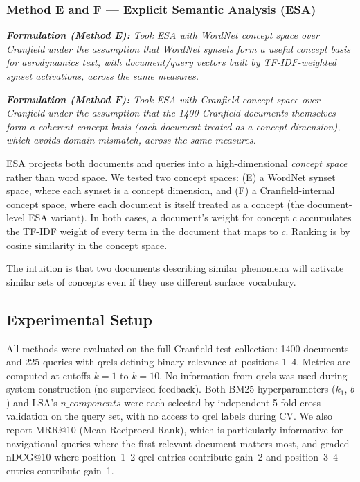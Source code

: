 \documentclass{article}
\begin{document}
\subsubsection{Method E and F --- Explicit Semantic Analysis (ESA)}

\textit{\textbf{Formulation (Method E):} Took ESA with WordNet concept space over Cranfield under the assumption that WordNet synsets form a useful concept basis for aerodynamics text, with document/query vectors built by TF-IDF-weighted synset activations, across the same measures.}

\textit{\textbf{Formulation (Method F):} Took ESA with Cranfield concept space over Cranfield under the assumption that the 1400 Cranfield documents themselves form a coherent concept basis (each document treated as a concept dimension), which avoids domain mismatch, across the same measures.}

ESA projects both documents and queries into a high-dimensional \emph{concept space} rather than word space. We tested two concept spaces: (E) a WordNet synset space, where each synset is a concept dimension, and (F) a Cranfield-internal concept space, where each document is itself treated as a concept (the document-level ESA variant). In both cases, a document's weight for concept $c$ accumulates the TF-IDF weight of every term in the document that maps to $c$. Ranking is by cosine similarity in the concept space.

The intuition is that two documents describing similar phenomena will activate similar sets of concepts even if they use different surface vocabulary.

\subsection{Experimental Setup}

All methods were evaluated on the full Cranfield test collection: 1400 documents and 225 queries with qrels defining binary relevance at positions 1--4. Metrics are computed at cutoffs $k{=}1$ to $k{=}10$. No information from qrels was used during system construction (no supervised feedback). Both BM25 hyperparameters ($k_1$, $b$) and LSA's $n\_components$ were each selected by independent 5-fold cross-validation on the query set, with no access to qrel labels during CV. We also report MRR@10 (Mean Reciprocal Rank), which is particularly informative for navigational queries where the first relevant document matters most, and graded nDCG@10 where position~1--2 qrel entries contribute gain~2 and position~3--4 entries contribute gain~1.
\end{document}
